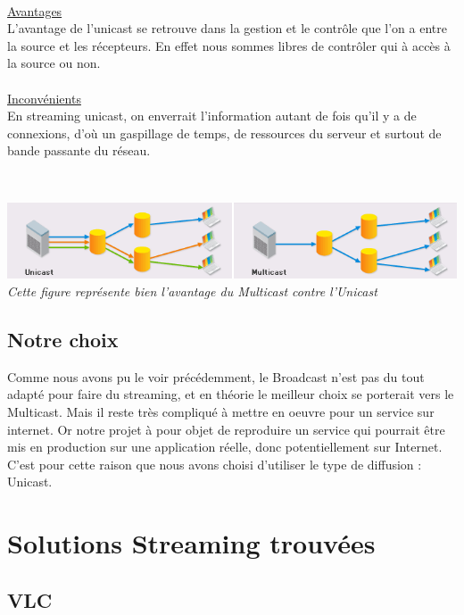 \documentclass{report}
\begin{document}
    \\
    \underline{Avantages}\\
    
    L’avantage de l’unicast se retrouve dans la gestion et le contrôle que l’on a entre la source et les récepteurs. En effet nous sommes libres de contrôler qui à accès à la source ou non.
    \\
  
    \\    
    \underline{Inconvénients}\\
    
    En streaming unicast, on enverrait l'information autant de fois qu'il y a de connexions, d'où un gaspillage de temps, de ressources du serveur et surtout de bande passante du réseau.	
    
    \\
    \begin{center}
    \includegraphics[width=16cm]{img/uni.png}
    \textit{\small{Cette figure représente bien l'avantage du Multicast contre l'Unicast}}
    \end{center}

    
    
        \subsection{Notre choix}
    
   Comme nous avons pu le voir précédemment, le Broadcast n’est pas du tout adapté pour faire du streaming, et en théorie le meilleur choix se porterait vers le Multicast. Mais il reste très compliqué à mettre en oeuvre pour un service sur internet. Or notre projet à pour objet de reproduire un service qui pourrait être mis en production sur une application réelle, donc potentiellement sur Internet. C’est pour cette raison que nous avons choisi d’utiliser le type de diffusion : Unicast.	

    
    \section{Solutions Streaming trouvées}    
        
        \subsection{VLC}
     
\end{document}
